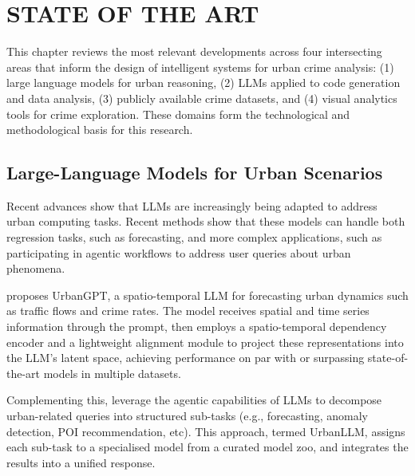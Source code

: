 \chapter{ STATE OF THE ART}

This chapter reviews the most relevant developments across four intersecting areas that inform the design of intelligent systems for urban crime analysis: (1) large language models for urban reasoning, (2) LLMs applied to code generation and data analysis, (3) publicly available crime datasets, and (4) visual analytics tools for crime exploration. These domains form the technological and methodological basis for this research.



\section{Large-Language Models for Urban Scenarios}

Recent advances show that LLMs are increasingly being adapted to address urban computing tasks. Recent methods show that these models can handle both regression tasks, such as forecasting, and more complex applications, such as participating in agentic workflows to address user queries about urban phenomena.

\citet{Li2024UrbanGPT} proposes UrbanGPT, a spatio-temporal LLM for forecasting urban dynamics such as traffic flows and crime rates. The model receives spatial and time series information through the prompt, then employs a spatio-temporal dependency encoder and a lightweight alignment module to project these representations into the LLM's latent space, achieving performance on par with or surpassing state-of-the-art models in multiple datasets. 

Complementing this, \cite{Jiang2024UrbanLLM} leverage the agentic capabilities of LLMs to decompose urban-related queries into structured sub-tasks (e.g., forecasting, anomaly detection, POI recommendation, etc). This approach, termed UrbanLLM, assigns each sub-task to a specialised model from a curated model zoo, and integrates the results into a unified response.

